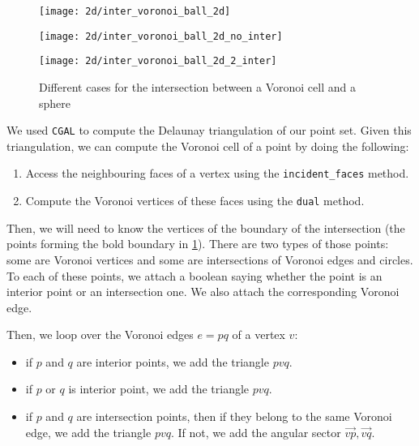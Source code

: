 \begin{figure}[h]
    \centering
    \begin{minipage}{0.32\linewidth}
        \centering
        \texttt{[image: 2d/inter\_voronoi\_ball\_2d]}
        \label{fig:inter_voronoi_ball_2d:a}
    \end{minipage}
    \begin{minipage}{0.32\linewidth}
        \centering
        \texttt{[image: 2d/inter\_voronoi\_ball\_2d\_no\_inter]}
        \label{fig:inter_voronoi_ball_2d:b}
    \end{minipage}
    \begin{minipage}{0.32\linewidth}
        \centering
        \texttt{[image: 2d/inter\_voronoi\_ball\_2d\_2\_inter]}
        \label{fig:inter_voronoi_ball_2d:c}
    \end{minipage}

   \caption{Different cases for the intersection between a Voronoi cell and a sphere}
   \label{fig:inter_voronoi_ball_2d}
\end{figure}

We used \texttt{CGAL} to compute the Delaunay triangulation of our point set.
Given this triangulation, we can compute the Voronoi cell of a point by doing
the following:
\begin{enumerate}
    \item Access the neighbouring faces of a vertex using the
        \texttt{incident\_faces} method.
    \item Compute the Voronoi vertices of these faces using the \texttt{dual}
        method.
\end{enumerate}

Then, we will need to know the vertices of the boundary of the intersection (the
points forming the bold boundary in \ref{fig:inter_voronoi_ball_2d}). There are
two types of those points: some are Voronoi vertices and some are intersections
of Voronoi edges and circles. To each of these points, we attach a boolean
saying whether the point is an interior point or an intersection one. We also
attach the corresponding Voronoi edge.

Then, we loop over the Voronoi edges $ e = pq $ of a vertex $ v $:
\begin{itemize}
    \item if $ p $ and $ q $ are interior points, we add the triangle $ pvq $.
    \item if $ p $ or $ q $ is interior point, we add the triangle $ pvq $.
    \item if $ p $ and $ q $ are intersection points, then if they belong to the
        same Voronoi edge, we add the triangle $ pvq $. If not, we add the
        angular sector $ \vec{vp}, \vec{vq} $.
\end{itemize}

